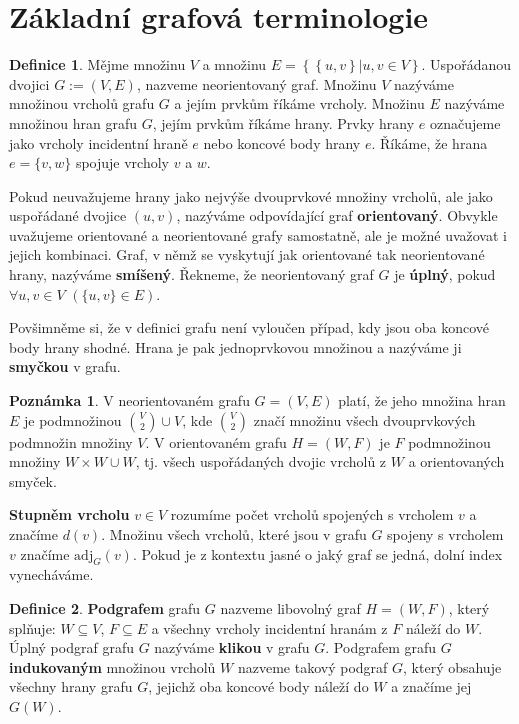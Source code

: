 \documentclass{ctuthesis}
\theoremstyle{plain}
\theoremstyle{definition}
\newtheorem{definition}{Definice}
\newtheorem{remark}{Poznámka}
\begin{document}
\section{Základní grafová terminologie}

\begin{definition}
  Mějme množinu $V$ a množinu $E = \left\{ \left\{ u,v \right\} | u,v \in V \right\}$. Uspořádanou dvojici $G := (V,E)$, nazveme neorientovaný graf. Množinu $V$ nazýváme množinou vrcholů grafu $G$ a jejím prvkům říkáme vrcholy. Množinu $E$ nazýváme množinou hran grafu $G$, jejím prvkům říkáme hrany. Prvky hrany $e$ označujeme jako vrcholy incidentní hraně $e$ nebo koncové body hrany $e$. Říkáme, že hrana $e = \{v,w\}$ spojuje vrcholy $v$ a $w$.
\end{definition}

Pokud neuvažujeme hrany jako nejvýše dvouprvkové množiny vrcholů, ale  jako uspořádané dvojice $(u,v)$, nazýváme odpovídající graf \textbf{orientovaný}. Obvykle uvažujeme orientované a neorientované grafy samostatně, ale je možné uvažovat i jejich kombinaci. Graf, v němž se vyskytují jak orientované tak neorientované hrany, nazýváme \textbf{smíšený}. Řekneme, že neorientovaný graf $G$ je \textbf{úplný}, pokud $\forall u, v \in V$ $\left(\{u,v\} \in E\right)$.

Povšimněme si, že v definici grafu není vyloučen případ, kdy jsou oba koncové body hrany shodné. Hrana je pak jednoprvkovou množinou a nazýváme ji \textbf{smyčkou} v grafu.

\begin{remark}
  V neorientovaném grafu $G=(V,E)$ platí, že jeho množina hran $E$ je podmnožinou ${V \choose 2} \cup V$, kde $V \choose 2$ značí množinu všech dvouprvkových podmnožin množiny $V$. V orientovaném grafu $H=(W,F)$ je $F$ podmnožinou množiny $W \times W \cup W$, tj. všech uspořádaných dvojic vrcholů z $W$ a orientovaných smyček.
\end{remark}

\textbf{Stupněm vrcholu} $v \in V$ rozumíme počet vrcholů spojených s vrcholem $v$ a značíme $d(v)$. Množinu všech vrcholů, které jsou v grafu $G$ spojeny s vrcholem $v$ značíme $\mathrm{adj}_G(v)$. Pokud je z kontextu jasné o jaký graf se jedná, dolní index vynecháváme.

\begin{definition}
  \textbf{Podgrafem} grafu $G$ nazveme libovolný graf $H=(W,F)$, který splňuje: $W\subseteq V$, $F\subseteq E$ a všechny vrcholy incidentní hranám z $F$ náleží do $W$. Úplný podgraf grafu $G$ nazýváme \textbf{klikou} v grafu $G$. Podgrafem grafu $G$ \textbf{indukovaným} množinou vrcholů $W$ nazveme takový podgraf $G$, který obsahuje všechny hrany grafu $G$, jejichž oba koncové body náleží do $W$ a značíme jej $G(W)$.
\end{definition}
\end{document}

